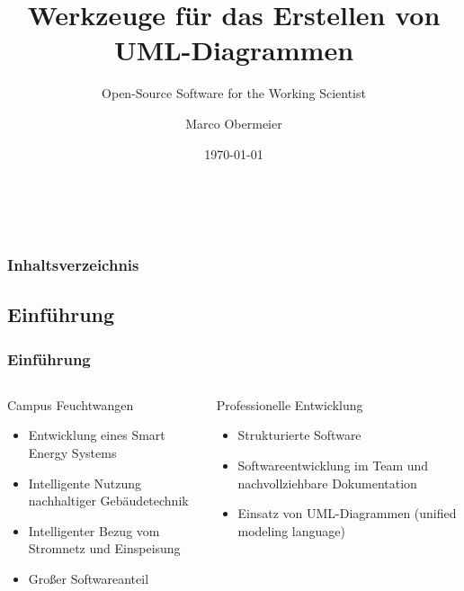 \documentclass[xcolor=dvipsnames]{beamer}
\title{Werkzeuge für das Erstellen von UML-Diagrammen}
\subtitle{Open-Source Software for the Working Scientist \\}
\institute{Master of Applied Research\\ Hochschule Ansbach\\}
\author{Marco Obermeier}
\date{\today}
\begin{document}
 
	\begin{frame}
		\frametitle{~}
		\maketitle 
	\end{frame}
	\begin{frame}
		\frametitle{Inhaltsverzeichnis}
		\tableofcontents
	\end{frame}
	
	
	\small
	\begin{frame}
		\section{Einführung}
		\frametitle{Einführung}
		\begin{columns}
			\begin{column}{0.50\textwidth}
				\begin{block}{Campus Feuchtwangen}
					\begin{itemize}
						\item Entwicklung eines Smart Energy Systems
						\item Intelligente Nutzung nachhaltiger Gebäudetechnik
						\item Intelligenter Bezug vom Stromnetz und Einspeisung
						\item Großer Softwareanteil
					\end{itemize}
				\end{block}
			\end{column}
			
			\begin{column}{0.50\textwidth}
				\begin{block}{Professionelle Entwicklung}
					\begin{itemize}
						\item Strukturierte Software
						\item Softwareentwicklung im Team und nachvollziehbare Dokumentation
						\item Einsatz von UML-Diagrammen (unified modeling language)
					\end{itemize}
				\end{block}
			\end{column}
		\end{columns}
		
	\end{frame}
	
\end{document}
